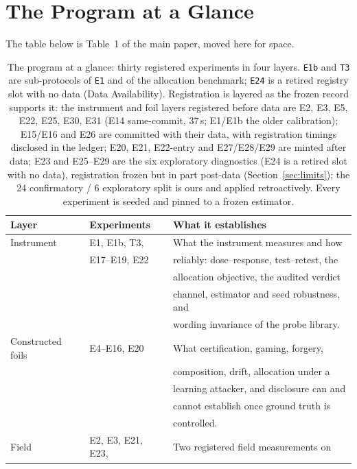 \section{The Program at a Glance}
\label{sec:supp-program}

The table below is Table~1 of the main paper, moved here for space.

\begin{table}[t]
\centering\footnotesize
\caption{The program at a glance: thirty registered experiments in four
layers. \texttt{E1b} and \texttt{T3} are sub-protocols of \texttt{E1} and of
the allocation benchmark; \texttt{E24} is a retired registry slot with no
data (Data Availability). Registration is layered as the frozen record
supports it: the instrument and foil layers registered before data are
E2, E3, E5, E22, E25, E30, E31 (E14 same-commit, $37$\,s; E1/E1b the
older calibration); E15/E16 and E26 are committed with
their data, with registration timings disclosed in the ledger; E20,
E21, E22-entry and E27/E28/E29 are minted after data; E23 and E25--E29
are the six exploratory diagnostics (E24 is a retired slot with no data),
registration frozen but in part post-data
(Section~\ref{sec:limits}); the 24 confirmatory / 6 exploratory split is
ours and applied retroactively. Every experiment is seeded and pinned to a
frozen estimator.}
\label{tab:program}
\setlength{\tabcolsep}{4pt}
\begin{tabular}{@{}p{}p{}p{}@{}}
\toprule
Layer & Experiments & What it establishes \\
\midrule
Instrument & E1, E1b, T3, & What the instrument measures and how \\
 & E17--E19, E22 & reliably: dose--response, test--retest, the \\
 & & allocation objective, the audited verdict \\
 & & channel, estimator and seed robustness, and \\
 & & wording invariance of the probe library. \\
Constructed foils & E4--E16, E20 & What certification, gaming, forgery, \\
 & & composition, drift, allocation under a \\
 & & learning attacker, and disclosure can and \\
 & & cannot establish once ground truth is \\
 & & controlled. \\
Field & E2, E3, E21, E23, & Two registered field measurements on \\

\end{tabular}
\end{table}
